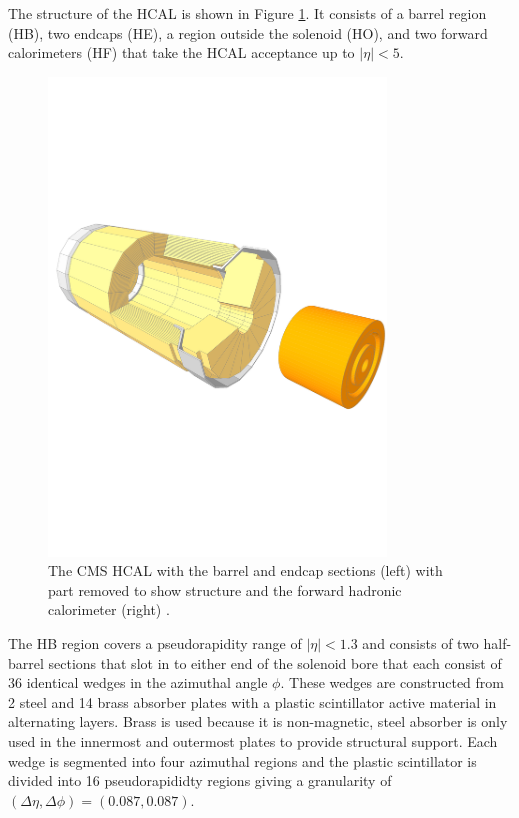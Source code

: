 The structure of the HCAL is shown in Figure \ref{fig:apparatus:hcal}. It consists of a barrel region (HB), two endcaps (HE), a region outside the solenoid (HO), and two forward calorimeters (HF) that take the HCAL acceptance up to $|\eta|<5$. 
\begin{figure}[h!]
    \centering
    \includegraphics[width=0.8\textwidth]{figures/apparatus/HCAL_HF.pdf}
    \caption{The CMS HCAL with the barrel and endcap sections (left) with part removed to show structure and the forward hadronic calorimeter (right) \cite{SketchupCMS}.}
    \label{fig:apparatus:hcal}
\end{figure}
The HB region covers a pseudorapidity range of $|\eta|<1.3$ and consists of two half-barrel sections that slot in to either end of the solenoid bore that each consist of 36 identical wedges in the azimuthal angle $\phi$. These wedges are constructed from 2 steel and 14 brass absorber plates with a plastic scintillator active material in alternating layers. Brass is used because it is non-magnetic, steel absorber is only used in the innermost and outermost plates to provide structural support. Each wedge is segmented into four azimuthal regions and the plastic scintillator is divided into 16 pseudorapididty regions giving a granularity of $(\Delta\eta,\Delta\phi) = (0.087,0.087)$.
